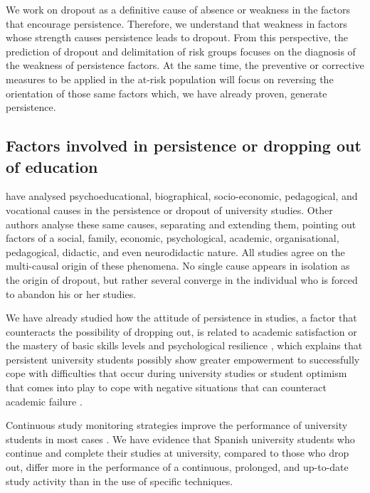 \documentclass[english]{textolivre}
\begin{document}
We work on dropout as a definitive cause of absence or weakness in the factors that encourage persistence. Therefore, we understand that weakness in factors whose strength causes persistence leads to dropout. From this perspective, the prediction of dropout and delimitation of risk groups focuses on the diagnosis of the weakness of persistence factors. At the same time, the preventive or corrective measures to be applied in the at-risk population will focus on reversing the orientation of those same factors which, we have already proven, generate persistence.

\subsection{Factors involved in persistence or dropping out of education}\label{sec-normas}
\textcite{triado_ivern_satisfaccion_2015,lizarte_alisis_2017} have analysed psychoeducational, biographical, socio-economic, pedagogical, and vocational causes in the persistence or dropout of university studies. Other authors \cite{lizarte_simon_determinantes_2020} analyse these same causes, separating and extending them, pointing out factors of a social, family, economic, psychological, academic, organisational, pedagogical, didactic, and even neurodidactic nature. All studies agree on the multi-causal origin of these phenomena. No single cause appears in isolation as the origin of dropout, but rather several converge in the individual who is forced to abandon his or her studies.

We have already studied how the attitude of persistence in studies, a factor that counteracts the possibility of dropping out, is related to academic satisfaction \cite{urbina_cardenas_abandono_2016} or the mastery of basic skills levels \cite{fernandez_cruz_formacion_2012} and psychological resilience \cite{lightsey_positive_2011}, which explains that persistent university students possibly show greater empowerment to successfully cope with difficulties that occur during university studies or student optimism that comes into play to cope with negative situations that can counteract academic failure \cite{sohail_stress_2013,avila_quinones_estilos_2014}.

Continuous study monitoring strategies improve the performance of university students in most cases \cite{carpenter_student_2015,lizarte_simon_determinantes_2020}. We have evidence that Spanish university students who continue and complete their studies at university, compared to those who drop out, differ more in the performance of a continuous, prolonged, and up-to-date study activity than in the use of specific techniques.  
\end{document}
